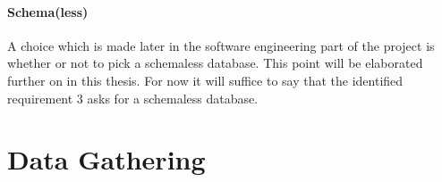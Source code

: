 \paragraph{Schema(less)}
\label{datamodel-schema}

A choice which is made later in the software engineering part of the project is whether or not to pick a schemaless database.
This point will be elaborated further on in this thesis.
For now it will suffice to say that the identified requirement 3 asks for a schemaless database.

\section{Data Gathering}
\label{datamodel-gathering}


